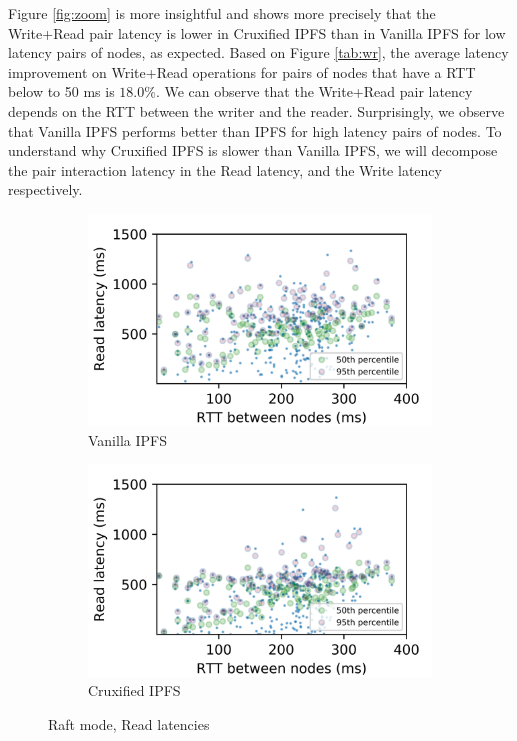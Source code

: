 \documentclass[a4paper,11pt,oneside]{report}
\begin{document}
Figure \ref{fig:zoom} is more insightful and shows more precisely that the Write+Read pair latency is lower in Cruxified IPFS than in Vanilla IPFS for low latency pairs of nodes, as expected. Based on Figure \ref{tab:wr}, the average latency improvement on Write+Read operations for pairs of nodes that have a RTT below to 50 ms is $18.0\%$. We can observe that the Write+Read pair latency depends on the RTT between the writer and the reader.
Surprisingly, we observe that Vanilla IPFS performs better than IPFS for high latency pairs of nodes. To understand why Cruxified IPFS is slower than Vanilla IPFS, we will decompose the pair interaction latency in the Read latency, and the Write latency respectively.

\begin{figure}[htbp!]
\centering
\begin{subfigure}{.5\textwidth}
  \centering
  \includegraphics[width=1\linewidth]{graphs/plot_read_vanilla_crdt.png}
  \caption{Vanilla IPFS}
  \label{fig:read1}
\end{subfigure}%
\begin{subfigure}{.5\textwidth}
  \centering
  \includegraphics[width=1\linewidth]{graphs/plot_read_cruxified_crdt.png}
  \caption{Cruxified IPFS}
  \label{fig:read2}
\end{subfigure}

\caption{Raft mode, Read latencies}
\label{fig:read}
\end{figure}
\end{document}
